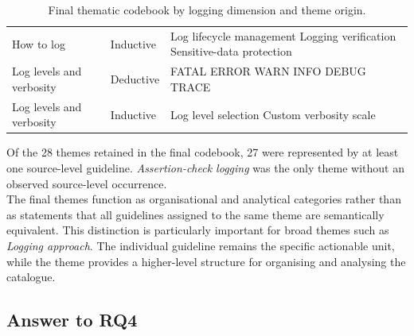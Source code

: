 \begin{table}[H]
\begin{tabularx}{\textwidth}{p{2.7cm} p{2.0cm} X}
        How to log &
        Inductive &
        Log lifecycle management \newline
        Logging verification \newline
        Sensitive-data protection \\

        Log levels and verbosity &
        Deductive &
        FATAL \newline
        ERROR \newline
        WARN \newline
        INFO \newline
        DEBUG \newline
        TRACE \\

        Log levels and verbosity &
        Inductive &
        Log level selection \newline
        Custom verbosity scale \\

        \bottomrule
    \end{tabularx}

    \caption{Final thematic codebook by logging dimension and theme origin.}
    \label{tab:final-codebook-summary}
\end{table}

Of the 28 themes retained in the final codebook, 27 were represented by at least
one source-level guideline. \textit{Assertion-check logging} was the only theme
without an observed source-level occurrence.
\\
The final themes function as organisational and analytical categories rather than
as statements that all guidelines assigned to the same theme are semantically
equivalent. This distinction is particularly important for broad themes such as
\textit{Logging approach}. The individual guideline remains the specific actionable
unit, while the theme provides a higher-level structure for organising and analysing
the catalogue.


\subsection{Answer to RQ4}

